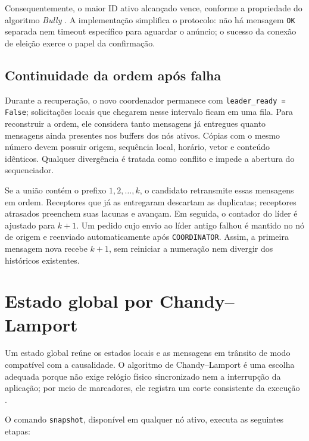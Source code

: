 Consequentemente, o maior ID ativo alcançado vence, conforme a propriedade do
algoritmo \textit{Bully} \cite{tanenbaum2007}. A implementação simplifica o protocolo:
não há mensagem \texttt{OK} separada nem timeout específico para aguardar o anúncio;
o sucesso da conexão de eleição exerce o papel da confirmação.

\subsection{Continuidade da ordem após falha}

Durante a recuperação, o novo coordenador permanece com
\texttt{leader\_ready = False}; solicitações locais que chegarem nesse intervalo
ficam em uma fila. Para reconstruir a ordem, ele considera tanto mensagens já
entregues quanto mensagens ainda presentes nos buffers dos nós ativos. Cópias com
o mesmo número devem possuir origem, sequência local, horário, vetor e conteúdo
idênticos. Qualquer divergência é tratada como conflito e impede a abertura do
sequenciador.

Se a união contém o prefixo $1,2,\ldots,k$, o candidato retransmite essas mensagens
em ordem. Receptores que já as entregaram descartam as duplicatas; receptores
atrasados preenchem suas lacunas e avançam. Em seguida, o contador do líder é
ajustado para $k+1$. Um pedido cujo envio ao líder antigo falhou é mantido no nó de
origem e reenviado automaticamente após \texttt{COORDINATOR}. Assim, a primeira
mensagem nova recebe $k+1$, sem reiniciar a numeração nem divergir dos históricos
existentes.

\section{Estado global por Chandy--Lamport}\label{sec:estado-global}

Um estado global reúne os estados locais e as mensagens em trânsito de modo
compatível com a causalidade. O algoritmo de Chandy--Lamport é uma escolha adequada
porque não exige relógio físico sincronizado nem a interrupção da aplicação; por
meio de marcadores, ele registra um corte consistente da execução
\cite{chandy1985}.

O comando \texttt{snapshot}, disponível em qualquer nó ativo, executa as seguintes
etapas:

